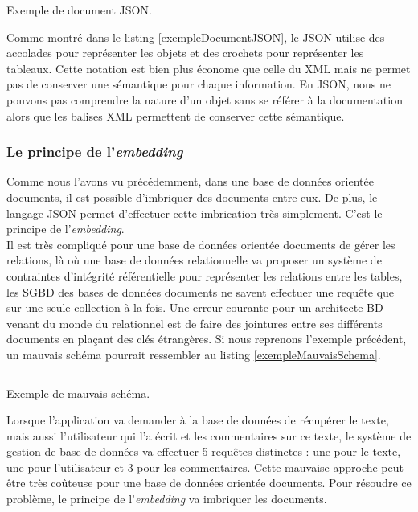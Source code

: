 	\begin{listing}[H]
		\inputminted{json}{code/exemple.json}
		\caption{Exemple de document JSON.}
		\label{exempleDocumentJSON}
	\end{listing}

	Comme montré dans le listing \ref{exempleDocumentJSON}, le JSON utilise des accolades pour représenter les objets et des crochets pour représenter les tableaux. Cette notation est bien plus économe que celle du XML mais ne permet pas de conserver une sémantique pour chaque information. En JSON, nous ne pouvons pas comprendre la nature d'un objet sans se référer à la documentation alors que les balises XML permettent de conserver cette sémantique.

	\subsubsection{Le principe de l'\textit{embedding}}

	Comme nous l'avons vu précédemment, dans une base de données orientée documents, il est possible d'imbriquer des documents entre eux. De plus, le langage JSON permet d'effectuer cette imbrication très simplement. C'est le principe de l'\textit{embedding}.\\

	Il est très compliqué pour une base de données orientée documents de gérer les relations, là où une base de données relationnelle va proposer un système de contraintes d'intégrité référentielle pour représenter les relations entre les tables, les SGBD des bases de données documents ne savent effectuer une requête que sur une seule collection à la fois. Une erreur courante pour un architecte BD venant du monde du relationnel est de faire des jointures entre ses différents documents en plaçant des clés étrangères. Si nous reprenons l'exemple précédent, un mauvais schéma pourrait ressembler au listing \ref{exempleMauvaisSchema}.

	\begin{listing}[H]
		\inputminted{json}{code/exempleMauvaisSchema.json}
		\caption{Exemple de mauvais schéma.}
		\label{exempleMauvaisSchema}
	\end{listing}

	Lorsque l'application va demander à la base de données de récupérer le texte, mais aussi l'utilisateur qui l'a écrit et les commentaires sur ce texte, le système de gestion de base de données va effectuer 5 requêtes distinctes : une pour le texte, une pour l'utilisateur et 3 pour les commentaires. Cette mauvaise approche peut être très coûteuse pour une base de données orientée documents. Pour résoudre ce problème, le principe de l'\textit{embedding} va imbriquer les documents.\\

